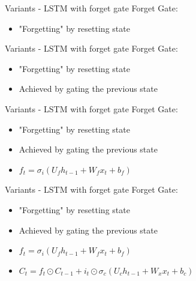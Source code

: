 \documentclass[10pt, aspectratio=169]{beamer}
\begin{document}
\begin{frame}[t]{Variants - LSTM with forget gate}
Forget Gate:
\begin{itemize}
    \item "Forgetting" by resetting state
\end{itemize}
\end{frame}

\begin{frame}[t]{Variants - LSTM with forget gate}
Forget Gate:
\begin{itemize}
    \item "Forgetting" by resetting state
    \item Achieved by gating the previous state
\end{itemize}
\end{frame}

\begin{frame}[t]{Variants - LSTM with forget gate}
Forget Gate:
\begin{itemize}
    \item "Forgetting" by resetting state
    \item Achieved by gating the previous state
    \item \begin{math}f_t=\sigma_i\left(U_{f}h_{t-1}+W_{f} x_t + b_f\right)\end{math}
\end{itemize}
\end{frame}

\begin{frame}[t]{Variants - LSTM with forget gate}
Forget Gate:
\begin{itemize}
    \item "Forgetting" by resetting state
    \item Achieved by gating the previous state
    \item \begin{math}f_t=\sigma_i\left(U_{f}h_{t-1}+W_{f} x_t + b_f\right)\end{math}
    \item \begin{math}C_t=f_t\odot C_{t-1}+i_t\odot\sigma_c\left(U_{c}h_{t-1}+W_{x}x_t + b_c\right)\end{math}
\end{itemize}
\end{frame}
\end{document}
